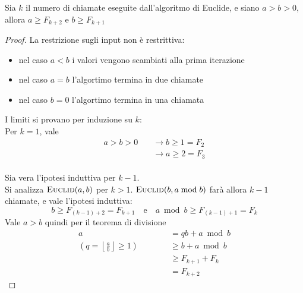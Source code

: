 \begin{lemma}
    \label{lem:euclide_iterazioni}
    Sia $k$ il numero di chiamate eseguite dall'algoritmo di Euclide, e siano $
    a > b > 0
    $, allora $
    a \geq F_{k+2}
    $ e $
    b \geq F_{k+1}
    $
    \begin{proof}
        La restrizione sugli input non è restrittiva:
        \begin{itemize}[noitemsep,parsep=0pt,partopsep=0pt,topsep=0pt]
            \item nel caso $a<b$ i valori vengono scambiati alla prima iterazione
            \item nel caso $a=b$ l'algortimo termina in due chiamate
            \item nel caso $b=0$ l'algortimo termina in una chiamata
        \end{itemize}
        I limiti si provano per induzione su $k$:
        \\
        Per $k=1$, vale 
        \begin{align*}
            a > b > 0
            \quad
            &
            \rightarrow
            b \geq 1 = F_2
            \\
            &
            \rightarrow
            a \geq 2 = F_3
        \end{align*}
        \\
        Sia vera l'ipotesi induttiva per $k-1$.
        \\
        Si analizza $\text{\textsc{Euclid}}(a,b)$ per $k>1$.
        $\text{\textsc{Euclid}}(b, a \bmod b)$ farà allora $k-1$ chiamate, e vale l'ipotesi induttiva:
        \begin{equation*}
            b \geq F_{(k-1)+2} = F_{k+1}
            \quad
            \text{e}
            \quad
            a \bmod b \geq F_{(k-1)+1} = F_{k}
        \end{equation*}
        Vale $a>b$ quindi per il teorema di divisione
        \begin{align*}
            a &= qb + a \bmod b
            \\
            \left( 
                q = \left\lfloor 
                    \frac{a}{b}
                \right\rfloor \geq 1
            \right)
            \quad 
            \quad 
            \quad 
            &
            \geq
            b + a \bmod b
            \\
            &
            \geq
            F_{k+1}
            +
            F_{k}
            \\
            &= 
            F_{k+2}
        \end{align*}
    \end{proof}
\end{lemma}

